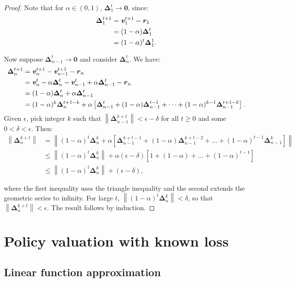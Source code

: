 \documentclass{article}
\renewcommand{\vec}[1]{\textbf{\textit{#1}}}
\newcommand{\val}{\vec{v}}
\newcommand{\valt}{\val}
\renewcommand{\r}{\textbf{\textit{r}}}
\newcommand{\dv}{\bm{\Delta}}
\newcommand{\norm}[1]{\left\lVert #1 \right\rVert}
\begin{document}
\begin{proof}
Note that for  $\alpha \in (0, 1)$, $\dv^t_1 \to \bm{0}$, since:
\begin{align*}
\dv^{t+1}_1 &= \valt^{t+1}_1 - \r_1 \\
& = (1-\alpha)\dv_1^t\\
& = (1-\alpha)^t\dv_1^1.
\end{align*}

Now suppose $\dv^t_{n-1} \to \bm{0}$ and consider $\dv^t_{n}$. We have:
\begin{align*}
\dv^{t+1}_n &= \valt^{t+1}_n - \valt^{t+1}_{n-1} - \r_n \\
& = \valt^t_n - \alpha\dv^t_n - \valt^t_{n-1} + \alpha\dv^t_{n-1} - \r_n \\
& = (1 - \alpha)\dv^t_n + \alpha\dv^t_{n-1}\\
& = (1 - \alpha)^k\dv^{t+1-k}_n + \alpha\left[\dv^t_{n-1} + (1-\alpha)\dv^{t-1}_{n-1} + \dots  + (1-\alpha)^{k-1}\dv^{t+1-k}_{n-1} \right].
\end{align*}
Given $\epsilon$, pick integer $k$ such that $\norm{\dv^{k+t}_{n-1}} < \epsilon - \delta$ for all $t \geq 0$ and some $0 < \delta < \epsilon$. Then:
\begin{align*}
\norm{\dv^{k+t}_n} &= \norm{(1 - \alpha)^t\dv^{k}_n + \alpha\left[\dv^{k+t-1}_{n-1} + (1-\alpha)\dv^{k+t-2}_{n-1} + \dots  + (1-\alpha)^{t-1}\dv^{k}_{n-1} \right]}\\
& \leq \norm{(1 - \alpha)^t\dv^{k}_n} + \alpha(\epsilon - \delta)[1 + (1-\alpha) + \dots + (1-\alpha)^{t-1}]\\
& \leq \norm{(1 - \alpha)^t\dv^{k}_n} + (\epsilon - \delta),
\end{align*}

where the first inequality uses the triangle inequality and the second extends the geometric series to infinity. For large $t$, $\norm{(1 - \alpha)^t\dv^{k}_n} < \delta$, so that $ \norm{\dv^{k+t}_n} < \epsilon$. The result follows by induction.
\end{proof}

\section{Policy valuation with known loss}

\subsection{Linear function approximation}
\end{document}
